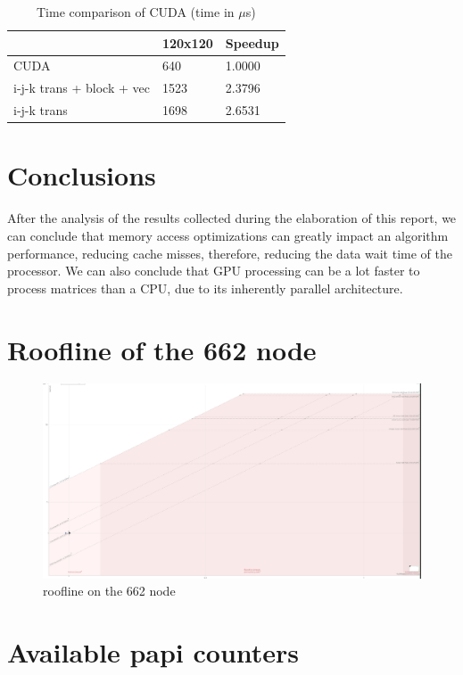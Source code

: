 \documentclass[a4paper]{report}
\begin{document}
\begin{table}[H]
\centering
\begin{tabular}{|l|l|l|}
\hline
                          & 120x120 & Speedup \\ \hline
CUDA                      & 640     & 1.0000  \\ \hline
i-j-k trans + block + vec & 1523    & 2.3796  \\ \hline
i-j-k trans               & 1698    & 2.6531  \\ \hline
\end{tabular}
\caption{Time comparison of CUDA (time in $\mu$s)}
\end{table}


\chapter{Conclusions}

After the analysis of the results collected during the elaboration of this
report, we can conclude that memory access optimizations can greatly
impact an algorithm performance, reducing cache misses, therefore, reducing the
data wait time of the processor.
We can also conclude that GPU processing can be a lot faster to process
matrices than a CPU, due to its inherently parallel architecture.

\appendix

\chapter{Roofline of the 662 node}
\begin{figure}[H]
    \centering
        \includegraphics[width=\textwidth]{images/roofline_cluster.png}
        \caption{roofline on the 662 node}
\end{figure}

\chapter{Available papi counters}\label{A:papi_avail}

\end{document}
